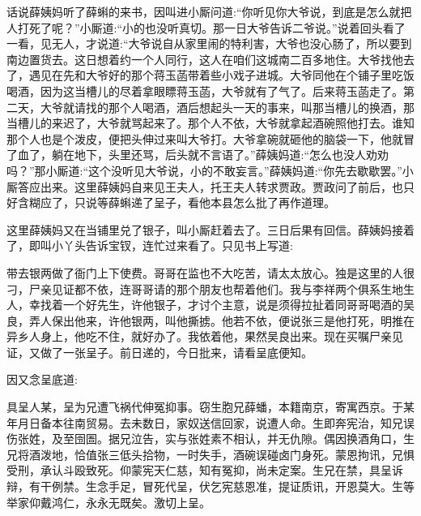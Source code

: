 


\begin{parag}
    话说薛姨妈听了薛蝌的来书，因叫进小厮问道:“你听见你大爷说，到底是怎么就把人打死了呢？”小厮道:“小的也没听真切。那一日大爷告诉二爷说。”说着回头看了一看，见无人，才说道:“大爷说自从家里闹的特利害，大爷也没心肠了，所以要到南边置货去。这日想着约一个人同行，这人在咱们这城南二百多地住。大爷找他去了，遇见在先和大爷好的那个蒋玉菡带着些小戏子进城。大爷同他在个铺子里吃饭喝酒，因为这当槽儿的尽着拿眼瞟蒋玉菡，大爷就有了气了。后来蒋玉菡走了。第二天，大爷就请找的那个人喝酒，酒后想起头一天的事来，叫那当槽儿的换酒，那当槽儿的来迟了，大爷就骂起来了。那个人不依，大爷就拿起酒碗照他打去。谁知那个人也是个泼皮，便把头伸过来叫大爷打。大爷拿碗就砸他的脑袋一下，他就冒了血了，躺在地下，头里还骂，后头就不言语了。”薛姨妈道:“怎么也没人劝劝吗？”那小厮道:“这个没听见大爷说，小的不敢妄言。”薛姨妈道:“你先去歇歇罢。”小厮答应出来。这里薛姨妈自来见王夫人，托王夫人转求贾政。贾政问了前后，也只好含糊应了，只说等薛蝌递了呈子，看他本县怎么批了再作道理。
\end{parag}


\begin{parag}
    这里薛姨妈又在当铺里兑了银子，叫小厮赶着去了。三日后果有回信。薛姨妈接着了，即叫小丫头告诉宝钗，连忙过来看了。只见书上写道:
\end{parag}


\begin{parag}
    带去银两做了衙门上下使费。哥哥在监也不大吃苦，请太太放心。独是这里的人很刁，尸亲见证都不依，连哥哥请的那个朋友也帮着他们。我与李祥两个俱系生地生人，幸找着一个好先生，许他银子，才讨个主意，说是须得拉扯着同哥哥喝酒的吴良，弄人保出他来，许他银两，叫他撕掳。他若不依，便说张三是他打死，明推在异乡人身上，他吃不住，就好办了。我依着他，果然吴良出来。现在买嘱尸亲见证，又做了一张呈子。前日递的，今日批来，请看呈底便知。
\end{parag}


\begin{parag}
    因又念呈底道:
\end{parag}


\begin{qute2sp}
    具呈人某，呈为兄遭飞祸代伸冤抑事。窃生胞兄薛蟠，本籍南京，寄寓西京。于某年月日备本往南贸易。去未数日，家奴送信回家，说遭人命。生即奔宪治，知兄误伤张姓，及至囹圄。据兄泣告，实与张姓素不相认，并无仇隙。偶因换酒角口，生兄将酒泼地，恰值张三低头拾物，一时失手，酒碗误碰卤门身死。蒙恩拘讯，兄惧受刑，承认斗殴致死。仰蒙宪天仁慈，知有冤抑，尚未定案。生兄在禁，具呈诉辩，有干例禁。生念手足，冒死代呈，伏乞宪慈恩准，提证质讯，开恩莫大。生等举家仰戴鸿仁，永永无既矣。激切上呈。
\end{qute2sp}


